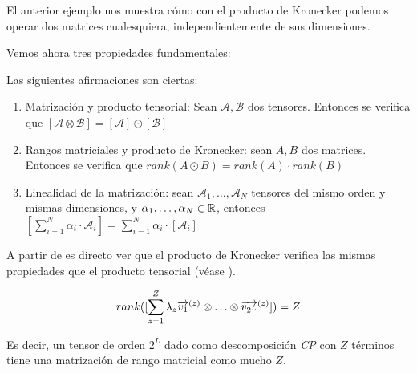 \begin{observacion}
    El anterior ejemplo nos muestra cómo con el producto de Kronecker podemos operar dos matrices cualesquiera, independientemente de sus dimensiones.
\end{observacion}

Vemos ahora tres propiedades fundamentales:

\begin{proposicion} Las siguientes afirmaciones son ciertas:

    \begin{enumerate}
        \item Matrización y producto tensorial: Sean $\mathcal{A}, \mathcal{B}$ dos tensores. Entonces se verifica que $[\mathcal{A} \otimes \mathcal{B}] = [\mathcal{A}] \odot [\mathcal{B}]$ \label{prop:prop_fundamentales_primera}
        \item Rangos matriciales y producto de Kronecker: sean $A, B$ dos matrices. Entonces se verifica que $rank(A \odot B) = rank(A) \cdot rank(B)$
        \item Linealidad de la matrización: sean $\mathcal{A}_1, \ldots, \mathcal{A}_N$ tensores del mismo orden y mismas dimensiones, y $\alpha_1, \ldots, \alpha_N \in \mathbb{R}$, entonces $[\sum_{i = 1}^N \alpha_i \cdot \mathcal{A}_i] = \sum_{i = 1}^N \alpha_i \cdot [\mathcal{A}_i]$
    \end{enumerate}

\end{proposicion}

\begin{observacion} A partir de  es directo ver que el producto de Kronecker verifica las mismas propiedades que el producto tensorial (véase ).
\end{observacion}

\begin{proposicion} \label{prop:rango_matricial_descomp_cp}

    \begin{equation}
        rank([\sum_{z = 1}^Z \lambda_z \overrightarrow{v_1}^{(z)} \otimes \ldots \otimes \overrightarrow{v_{2^L}}^{(z)}]) = Z
    \end{equation}

    Es decir, un tensor de orden $2^L$ dado como descomposición \textit{CP} con $Z$ términos tiene una matrización de rango matricial como mucho $Z$.

\end{proposicion}

